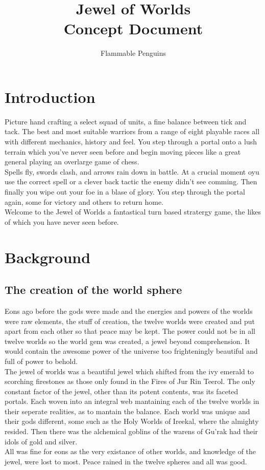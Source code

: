 \documentclass[a4paper,twocolumn]{article}
\author{Flammable Penguins}
\title{\textbf{Jewel of Worlds} \\ Concept Document}
\begin{document}
\newcommand{\TinySection}[1]{\begin{flushright} \textbf{#1} \end{flushright}}

\maketitle

\tableofcontents

\newpage \section{Introduction}
Picture hand crafting a select squad of units, a fine balance between tick and tack. The best and most suitable warriors from a range of eight playable races all with different mechanics, history and feel. You step through a portal onto a lush terrain which you've never seen before and begin moving pieces like a great general playing an overlarge game of chess.\\
Spells fly, swords clash, and arrows rain down in battle. At a crucial moment oyu use the correct spell or a clever back tactic the enemy didn't see comming. Then finally you wipe out your foe in a blase of glory. You step through the portal again, some for victory and others to return home.\\
Welcome to the Jewel of Worlds a fantastical turn based stratergy game, the likes of which you have never seen before.

\newpage \section{Background}

\subsection{The creation of the world sphere}

Eons ago before the gods were made and the energies and powers of the worlds were raw elements, the stuff of creation, the twelve worlds were created and put apart from each other so that peace may be kept. The power could not be in all twelve worlds so the world gem was created, a jewel beyond comprehension. It would contain the awesome power of the universe too frighteningly beautiful and full of power to behold. \\
The jewel of worlds was a beautiful jewel which shifted from the ivy emerald to scorching firestones as those only found in the Fires of Jur Rin Teerol. The only constant factor of the jewel, other than its potent contents, was its faceted portals. Each woven into an integral web mantaining each of the twelve worlds in their seperate realities, as to mantain the balance. Each world was unique and their gods different, some such as the Holy Worlds of Ireekal, where the almighty resided. Then there was the alchemical goblins of the warens of Gu'rak had their idols of gold and silver.\\
All was fine for eons as the very existance of other worlds, and knowledge of the jewel, were lost to most. Peace rained in the twelve spheres and all was good.
\end{document}
